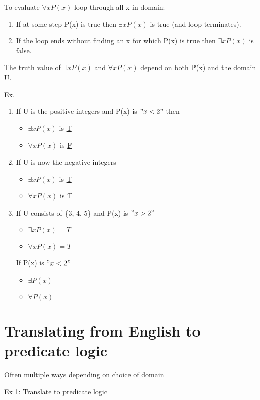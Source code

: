 \documentclass{article}
\begin{document}
\hfill \break
To evaluate $\forall xP(x)$ loop through all x in domain:
\begin{enumerate}
    \item If at some step P(x) is true then $\exists xP(x)$ is true (and loop terminates).
    \item If the loop ends without finding an x for which P(x) is true then $\exists xP(x)$ is false.
\end{enumerate}
\hfill \break
The truth value of $\exists xP(x)$ and $\forall xP(x)$ depend on both P(x) \underline{and} the domain U.

\hfill \break
\underline{Ex.}
\begin{enumerate}
    \item If U is the positive integers and P(x) is $"x<2"$ then
    \begin{itemize}
        \item $\exists xP(x)$ is \underline{T}
        \item $\forall xP(x)$ is \underline{F}
    \end{itemize}
    \item If U is now the negative integers
    \begin{itemize}
        \item $\exists xP(x)$ is \underline{T}
        \item $\forall xP(x)$ is \underline{T}
    \end{itemize}
    \item If U consists of \{3, 4, 5\} and P(x) is $"x>2"$
    \begin{itemize}
        \item $\exists xP(x)=T$
        \item $\forall xP(x)=T$
    \end{itemize}
    If P(x) is $"x<2"$
    \begin{itemize}
        \item $\exists P(x)$
        \item $\forall P(x)$
    \end{itemize}
\end{enumerate}

\section{Translating from English to predicate logic}
Often multiple ways depending on choice of domain

\hfill \break
\underline{Ex 1}: Translate to predicate logic
\end{document}
